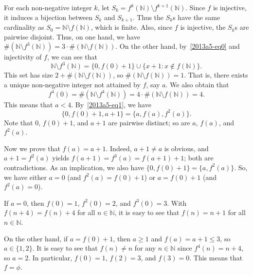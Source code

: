 \documentclass{article}
\newcommand{\N}{\mathbb{N}}
\begin{document}
For each non-negative integer $k$, let $S_k = f^k(\N) \setminus f^{k + 1}(\N)$.
Since $f$ is injective, it induces a bijection between $S_k$ and $S_{k + 1}$.
Thus the $S_k$s have the same cardinality as $S_0 = \N \setminus f(\N)$, which is finite.
Also, since $f$ is injective, the $S_k$s are pairwise disjoint.
Thus, on one hand, we have $\#(\N \setminus f^3(\N)) = 3 \cdot \#(\N \setminus f(\N))$.
On the other hand, by~\eqref{2013a5-eq0} and injectivity of $f$, we can see that
\[ \N \setminus f^3(\N) = \{0, f(0) + 1\} \cup \{x + 1 : x \notin f(\N)\}. \tag{1}\label{2013a5-eq1} \]
This set has size $2 + \#(\N \setminus f(\N))$, so $\#(\N \setminus f(\N)) = 1$.
That is, there exists a unique non-negative integer not attained by $f$, say $a$.
We also obtain that
\[ f^4(0) = \#(\N \setminus f^4(\N)) = 4 \cdot \#(\N \setminus f(\N)) = 4. \]
This means that $a < 4$.
By~\eqref{2013a5-eq1}, we have
\[ \{0, f(0) + 1, a + 1\} = \{a, f(a), f^2(a)\}. \]
Note that $0$, $f(0) + 1$, and $a + 1$ are pairwise distinct; so are $a$, $f(a)$, and $f^2(a)$.

Now we prove that $f(a) = a + 1$.
Indeed, $a + 1 \neq a$ is obvious, and $a + 1 = f^2(a)$ yields $f(a + 1) = f^3(a) = f(a + 1) + 1$; both are contradictions.
As an implication, we also have $\{0, f(0) + 1\} = \{a, f^2(a)\}$.
So, we have either $a = 0$ (and $f^2(a) = f(0) + 1$) or $a = f(0) + 1$ (and $f^2(a) = 0$).

If $a = 0$, then $f(0) = 1$, $f^2(0) = 2$, and $f^3(0) = 3$.
With $f(n + 4) = f(n) + 4$ for all $n \in \N$, it is easy to see that $f(n) = n + 1$ for all $n \in \N$.

On the other hand, if $a = f(0) + 1$, then $a \geq 1$ and $f(a) = a + 1 \leq 3$, so $a \in \{1, 2\}$.
It is easy to see that $f(n) \neq n$ for any $n \in \N$ since $f^4(n) = n + 4$, so $a = 2$.
In particular, $f(0) = 1$, $f(2) = 3$, and $f(3) = 0$.
This means that $f = \phi$.
\end{document}
